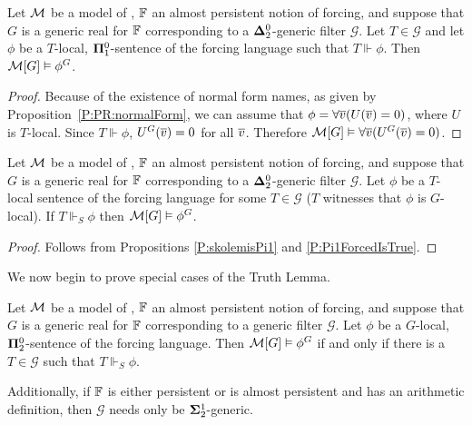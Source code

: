 \begin{prop}\label{P:Pi1ForcedIsTrue}
Let $\mathcal{M}$ be a model of \RCAo, $\mathbb{F}$ an almost persistent notion of forcing,
and suppose that $G$ is a generic real for $\mathbb{F}$
corresponding to a $\mathbf{\Delta}^0_2$-generic filter $\mathcal{G}$.
Let $T\in\mathcal{G}$ and let $\phi$ be a $T$-local, $\mathbf{\Pi}^0_1$-sentence
of the forcing language such that $T\Vdash\phi$.
Then $\mathcal{M}[G]\vDash\phi^G$.
\end{prop}
\begin{proof}
Because of the existence of normal form names,
as given by Proposition~\ref{P:PR:normalForm},
we can assume that
$\phi=\forall \overline{v}(U(\overline{v})=0)$, where $U$ is $T$-local.
Since $T\Vdash\phi$, $U^G(\overline{v})=0$ for all $\overline{v}$.
Therefore $\mathcal{M}[G]\vDash\forall\overline{v}(U^G(\overline{v})=0)$.
\end{proof}

\begin{cor}\label{C:Sforcedistrue}
Let $\mathcal{M}$ be a model of \RCAo, $\mathbb{F}$ an almost persistent notion of forcing,
and suppose that $G$ is a generic real for $\mathbb{F}$
corresponding to a $\mathbf{\Delta}^0_2$-generic filter $\mathcal{G}$.
Let $\phi$ be a $T$-local sentence of the forcing language
for some $T\in\mathcal{G}$ ($T$ witnesses that $\phi$ is $G$-local).
If $T\Vdash_S\phi$ then $\mathcal{M}[G]\vDash\phi^G$.
\end{cor}
\begin{proof}
Follows from Propositions \ref{P:skolemisPi1} and \ref{P:Pi1ForcedIsTrue}.
\end{proof}

We now begin to prove special cases of the Truth Lemma.

\begin{prop}\label{P:presRCAkey}
Let $\mathcal{M}$ be a model of \RCAo, $\mathbb{F}$ an almost persistent notion of forcing,
and suppose that $G$ is a generic real for $\mathbb{F}$
corresponding to a generic filter $\mathcal{G}$.
Let $\phi$ be a $G$-local, $\mathbf{\Pi}^0_2$-sentence of the forcing language.
Then $\mathcal{M}[G]\vDash\phi^G$ if and only if there is a $T\in\mathcal{G}$
such that $T\Vdash_S\phi$.

Additionally, if $\mathbb{F}$ is either persistent or is almost persistent
and has an arithmetic definition, then $\mathcal{G}$ needs only be
$\mathbf{\Sigma}^1_2$-generic.
\end{prop}

